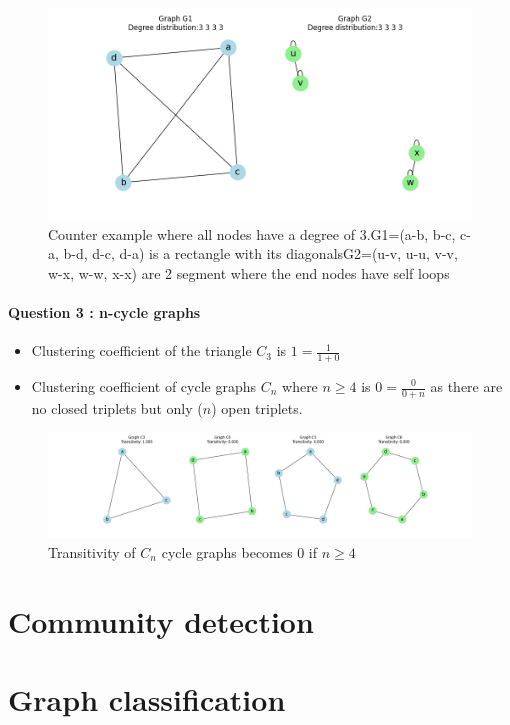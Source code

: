 \documentclass[a4paper]{article}
\begin{document}
\begin{figure}[ht]
    \centering
    \includegraphics[width=.6\textwidth]{figures/graph_compare_quad.png}
    \caption{Counter example where all nodes have a degree of 3.G1=(a-b, b-c, c-a, b-d, d-c, d-a) is a rectangle with its diagonalsG2=(u-v, u-u, v-v, w-x, w-w, x-x) are 2 segment where the end nodes have self loops}
    \label{fig:graph_compare_quad}
\end{figure}

\pagebreak
\subsection*{Question 3 : n-cycle graphs}
\begin{itemize}
    \item Clustering coefficient of the triangle $C_3$ is $1=\frac{1}{1+0}$
    \item Clustering coefficient of cycle graphs $C_n$ where $n \geq 4$ is $0=\frac{0}{0+n}$
    as there are no closed triplets but only ($n$) open triplets. 
\end{itemize}
\begin{figure}[ht]
        \centering
        \includegraphics[width=.6\textwidth]{figures/cycle_graphs.png}
        \caption{Transitivity of $C_n$ cycle graphs becomes 0 if $n \geq 4$}
        \label{fig:cycle_graphs}
\end{figure}

\pagebreak
\part[short]{Community detection}

\pagebreak
\part[short]{Graph classification}
\end{document}

